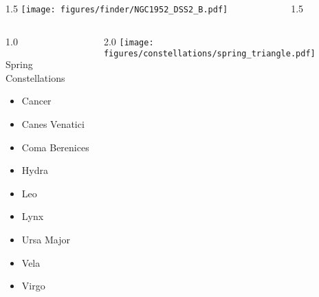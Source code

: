 \documentclass[final]{beamer}
\newlength{\colwidth}
\begin{document}

\begin{frame}[t]{}
    \begin{columns}[T]
        \begin{column}{1.5\colwidth}
            \centering
            \texttt{[image: figures/finder/NGC1952\_DSS2\_B.pdf]}
        \end{column}
        \begin{column}{1.5\colwidth}
            \Large
            
        \end{column}
    \end{columns}
\end{frame}


\begin{frame}[t]{}
    \begin{columns}[T]
        \begin{column}{1.0\colwidth}
            \Large
            \begin{block}{Spring Constellations}
                \begin{itemize}
                    \item{Cancer}
                    \item{Canes Venatici}
                    \item{Coma Berenices}
                    \item{Hydra}
                    \item{Leo}
                    \item{Lynx}
                    \item{Ursa Major}
                    \item{Vela}
                    \item{Virgo}
                \end{itemize}
            \end{block}
        \end{column}
        \begin{column}{2.0\colwidth}
            \centering
            \texttt{[image: figures/constellations/spring\_triangle.pdf]}
        \end{column}
    \end{columns}
\end{frame}
\end{document}
